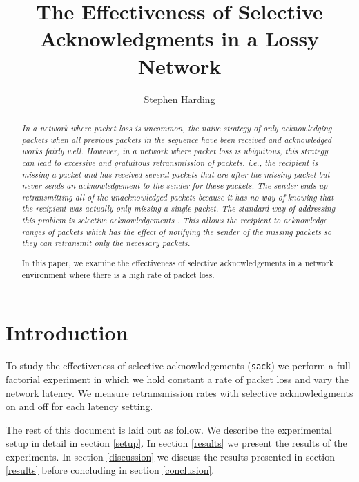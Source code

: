 \documentclass[]{article}
\begin{document}
\title{The Effectiveness of Selective Acknowledgments in a Lossy Network}
\author{Stephen Harding}

\maketitle

\begin{abstract}\it\normalsize
In a network where packet loss is uncommon, the naive strategy of only
acknowledging packets when all previous packets in the sequence have been
received and acknowledged works fairly well. However, in a network 
where packet loss is ubiquitous, this strategy can lead to excessive and
gratuitous retransmission of packets. i.e., the recipient is missing a packet
and has received several packets that are after the missing packet but never
sends an acknowledgement to the sender for these packets. The sender ends up
retransmitting all of the unacknowledged packets because it has no way of knowing
that the recipient was actually only missing a single packet. The standard way
of addressing this problem is selective acknowledgements \cite{floyd1996tcp}. This 
allows the recipient to acknowledge ranges of packets which has the effect of notifying
the sender of the missing packets so they can retransmit only the necessary packets.

In this paper, we examine the effectiveness of selective acknowledgements in
a network environment where there is a high rate of packet loss. 
\end{abstract}\normalfont

\section{Introduction}
To study the effectiveness of selective acknowledgements (\texttt{sack}) we perform a 
full factorial experiment in which we hold constant a rate of packet loss and
vary the network latency. We measure retransmission rates with selective
acknowledgments on and off for each latency setting.

The rest of this document is laid out as follow. We describe the experimental 
setup in detail in section \ref{setup}. In section \ref{results} we present
the results of the experiments. In section \ref{discussion} we discuss the
results presented in section \ref{results} before concluding in section
\ref{conclusion}.
\end{document}
